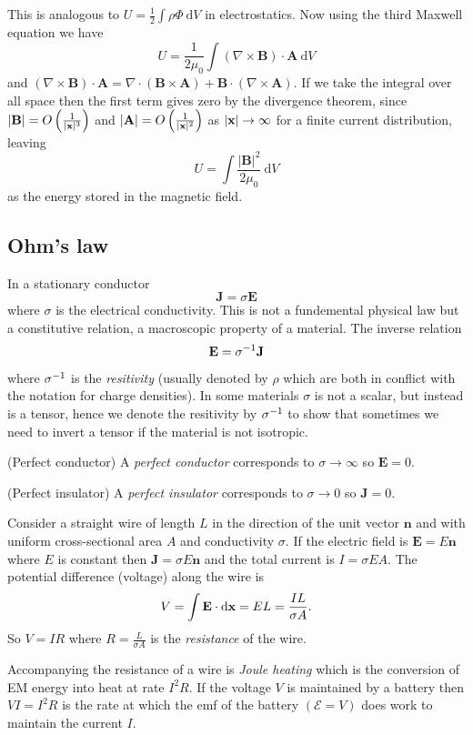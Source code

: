 \documentclass{article}
\begin{document}
This is analogous to $ U = \frac 12 \int \rho \Phi \ \mathrm dV $ in electrostatics. Now using the third Maxwell equation we have
\[
	U = \frac1{2\mu_0} \int (\nabla\times\mathbf B) \cdot\mathbf A \ \mathrm dV
\]
and $ (\nabla\times\mathbf B)\cdot\mathbf A = \nabla\cdot(\mathbf B\times\mathbf A) +\mathbf B \cdot(\nabla\times\mathbf A) $. If we take the integral over all space then the first term gives zero by the divergence theorem, since $ |\mathbf B| = O\left(\frac 1{|\mathbf{x}|^3}\right) $ and $ |\mathbf A| = O\left(\frac 1{|\mathbf{x}|^2}\right) $ as $ |\mathbf{x}|\to\infty $ for a finite current distribution, leaving
\[
	U = \int\frac{|\mathbf B|^2}{2\mu_0}\ \mathrm dV
\]
as the energy stored in the magnetic field.
\subsection{Ohm's law}
In a stationary conductor
\[
  \mathbf J = \sigma\mathbf E
\]
where $ \sigma $ is the electrical conductivity. This is not a fundemental physical law but a constitutive relation, a macroscopic property of a material. 
The inverse relation
\[
  \mathbf E = {\sigma}^{-1} \mathbf J
\]
where $ {\sigma}^{-1} $ is the \textit{resitivity} (usually denoted by $ \rho $ which are both in conflict with the notation for charge densities). In some materials $ \sigma $ is not a scalar, but instead is a tensor, hence we denote the resitivity by $ {\sigma}^{-1} $ to show that sometimes we need to invert a tensor if the material is not isotropic.
\begin{definition}
	(Perfect conductor) A \textit{perfect conductor} corresponds to $ \sigma\to\infty $ so $ \mathbf E = 0 $.
\end{definition}
\begin{definition}
	(Perfect insulator) A \textit{perfect insulator} corresponds to $ \sigma\to 0 $ so $ \mathbf J = 0 $.
\end{definition}

Consider a straight wire of length $ L $ in the direction of the unit vector $ \mathbf n $ and with uniform cross-sectional area $ A $ and conductivity $ \sigma $. If the electric field is $ \mathbf E = E\mathbf n  $ where $ E $ is constant then $ \mathbf J = \sigma E \mathbf n $ and the total current is $ I = \sigma EA $. The potential difference (voltage) along the wire is
\[
	V = \int \mathbf E \cdot\mathrm d \mathbf{x} = EL = \frac{IL}{\sigma A}.
\]
So $ V = IR $  where $ R = \frac L{\sigma A} $ is the \textit{resistance} of the wire.\par
Accompanying the resistance of a wire is \textit{Joule heating} which is the conversion of EM energy into heat at rate $ I^2R $. If the voltage $ V $ is maintained by a battery then $ VI = I^2 R $ is the rate at which the emf of the battery $ (\mathcal E = V) $ does work to maintain the current $ I $. 
\end{document}
